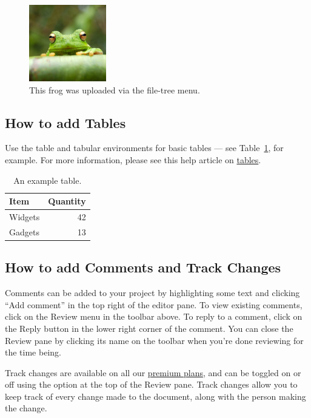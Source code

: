 \documentclass{article}
\begin{document}
\begin{figure}[H]
\centering
\includegraphics[width=0.3\textwidth]{images/frog.jpg}
\caption{\label{fig:frog}This frog was uploaded via the file-tree menu.}
\end{figure}

\subsection{How to add Tables}

Use the table and tabular environments for basic tables --- see Table~\ref{tab:widgets}, for example. For more information, please see this help article on \href{https://www.overleaf.com/learn/latex/tables}{tables}.

\begin{table}[H]
\centering
\begin{tabular}{l|r}
Item & Quantity \\\hline
Widgets & 42 \\
Gadgets & 13
\end{tabular}
\caption{\label{tab:widgets}An example table.}
\end{table}

\subsection{How to add Comments and Track Changes}

Comments can be added to your project by highlighting some text and clicking ``Add comment'' in the top right of the editor pane. To view existing comments, click on the Review menu in the toolbar above. To reply to a comment, click on the Reply button in the lower right corner of the comment. You can close the Review pane by clicking its name on the toolbar when you're done reviewing for the time being.

Track changes are available on all our \href{https://www.overleaf.com/user/subscription/plans}{premium plans}, and can be toggled on or off using the option at the top of the Review pane. Track changes allow you to keep track of every change made to the document, along with the person making the change.
\end{document}

